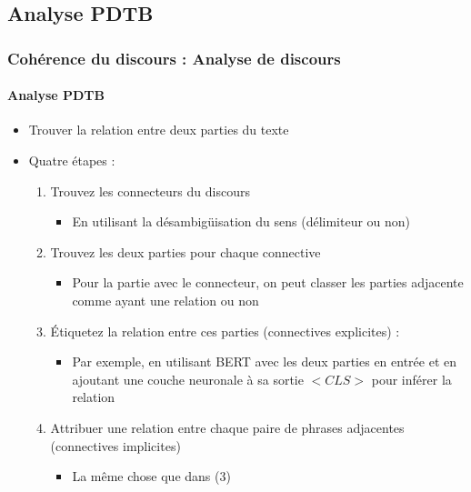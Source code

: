 \documentclass[xcolor=table]{beamer}
\begin{document}
\subsection{Analyse PDTB}

\begin{frame}
	\frametitle{Cohérence du discours : Analyse de discours}
	\framesubtitle{Analyse PDTB}
	
	\begin{itemize}
		\item Trouver la relation entre deux parties du texte
		\item Quatre étapes : 
		\begin{enumerate}
			\item Trouvez les connecteurs du discours
			\begin{itemize}
				\item En utilisant la désambigüisation du sens (délimiteur ou non)
			\end{itemize}
			\item Trouvez les deux parties pour chaque connective
			\begin{itemize}
				\item Pour la partie avec le connecteur, on peut classer les parties adjacente comme ayant une relation ou non
			\end{itemize}
			\item Étiquetez la relation entre ces parties (connectives explicites) : 
			\begin{itemize}
				\item Par exemple, en utilisant BERT avec les deux parties en entrée et en ajoutant une couche neuronale à sa sortie $ <CLS> $ pour inférer la relation
			\end{itemize}
			\item Attribuer une relation entre chaque paire de phrases adjacentes (connectives implicites)
			\begin{itemize}
				\item La même chose que dans (3)
			\end{itemize}
		\end{enumerate}
	\end{itemize}
	
\end{frame}


\end{document}
